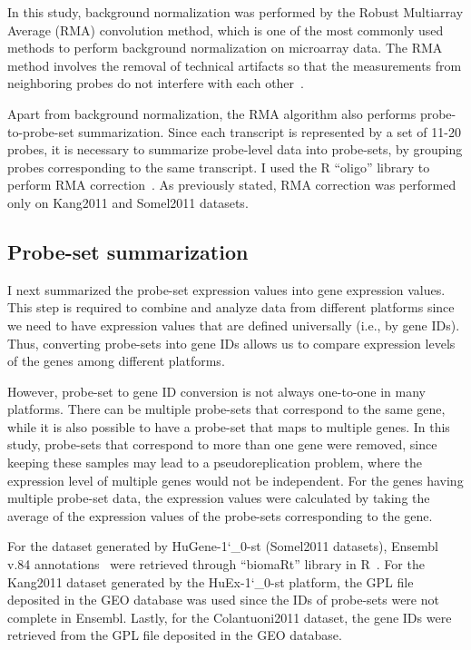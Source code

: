 In this study, background normalization was performed by the Robust Multiarray Average (RMA) convolution method, 
which is one of the most commonly used methods to perform background normalization on microarray data. 
The RMA method involves the removal of technical artifacts so that the measurements from neighboring probes do not interfere with each other~\cite{Irizarry2003}.

Apart from background normalization, the RMA algorithm also performs probe-to-probe-set summarization. 
Since each transcript is represented by a set of 11-20 probes, it is necessary to summarize probe-level data into probe-sets, 
by grouping probes corresponding to the same transcript. I used the R ``oligo'' library to perform RMA correction~\cite{Carvalho2010}.
As previously stated, RMA correction was performed only on Kang2011 and Somel2011 datasets.

\subsection{Probe-set summarization}
I next summarized the probe-set expression values into gene expression values. 
This step is required to combine and analyze data from different platforms since we need to have expression values that are defined universally (i.e., by gene IDs).
Thus, converting probe-sets into gene IDs allows us to compare expression levels of the genes among different platforms.

However, probe-set to gene ID conversion is not always one-to-one in many platforms. 
There can be multiple probe-sets that correspond to the same gene, while it is also possible to have a probe-set that maps to multiple genes. 
In this study, probe-sets that correspond to more than one gene were removed, since keeping these samples may lead to a pseudoreplication problem, 
where the expression level of multiple genes would not be independent. 
For the genes having multiple probe-set data, the expression values were calculated by taking the average of the expression values of the probe-sets corresponding to the gene.

For the dataset generated by HuGene-1\char`_0-st (Somel2011 datasets), 
Ensembl v.84 annotations~\cite{Yates2016} were retrieved through ``biomaRt'' library in R~\cite{Durinck2009}.
For the Kang2011 dataset generated by the HuEx-1\char`_0-st platform, the GPL file deposited in the GEO database was used since the IDs of probe-sets were not complete in Ensembl.
Lastly, for the Colantuoni2011 dataset, the gene IDs were retrieved from the GPL file deposited in the GEO database.

